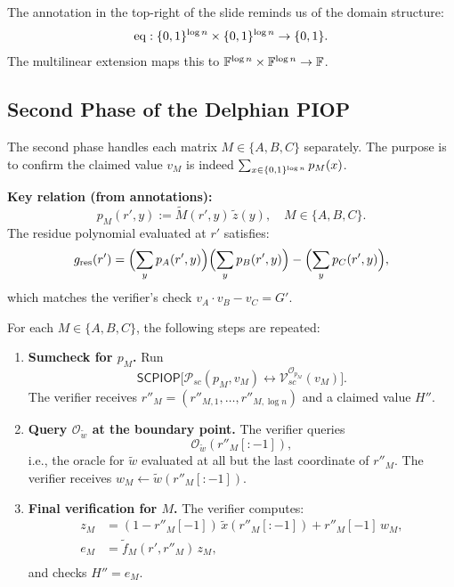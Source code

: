 \documentclass[11pt]{article}
\newcommand{\tildew}{\tilde{w}}
\newcommand{\tildez}{\tilde{z}}
\newcommand{\tildex}{\tilde{x}}
\newcommand{\tildeM}{\widetilde{M}}
\begin{document}
\begin{remark}
  The annotation in the top-right of the slide reminds us of the domain structure:
  \[
    \mathrm{eq} : \{0,1\}^{\log n} \times \{0,1\}^{\log n} \to \{0,1\}.
  \]
  The multilinear extension maps this to $\mathbb{F}^{\log n} \times \mathbb{F}^{\log n} \to \mathbb{F}$.
\end{remark}

\subsection{Second Phase of the Delphian PIOP}

The second phase handles each matrix $M \in \{A, B, C\}$ separately.  The purpose is to
confirm the claimed value $v_M$ is indeed $\sum_{x \in \{0,1\}^{\log n}} p_M(x)$.

\medskip
\noindent\textbf{Key relation (from annotations):}
\[
  p_M(r', y) := \tildeM(r', y)\,\tildez(y), \quad M \in \{A, B, C\}.
\]
The residue polynomial evaluated at $r'$ satisfies:
\[
  g_{\mathrm{res}}(r')
  = \Bigl(\sum_y p_A(r',y)\Bigr)\Bigl(\sum_y p_B(r',y)\Bigr)
    - \Bigl(\sum_y p_C(r',y)\Bigr),
\]
which matches the verifier's check $v_A \cdot v_B - v_C = G'$.

\bigskip
\noindent For each $M \in \{A, B, C\}$, the following steps are repeated:

\begin{enumerate}
  \item \textbf{Sumcheck for $p_M$.}  Run
    \[
      \mathsf{SCPIOP}\bigl[\mathcal{P}_{sc}(p_M, v_M)
      \leftrightarrow \mathcal{V}_{sc}^{\mathcal{O}_{p_M}}(v_M)\bigr].
    \]
    The verifier receives
    $r''_M = (r''_{M,1}, \ldots, r''_{M,\log n})$ and a claimed value $H''$.

  \item \textbf{Query $\mathcal{O}_{\tildew}$ at the boundary point.}  The verifier queries
    \[
      \mathcal{O}_{\tildew}(r''_M[:-1]),
    \]
    i.e., the oracle for $\tildew$ evaluated at all but the last coordinate of $r''_M$.
    The verifier receives $w_M \leftarrow \tildew(r''_M[:-1])$.

  \item \textbf{Final verification for $M$.}  The verifier computes:
    \begin{align*}
      z_M   &= (1 - r''_M[-1])\,\tildex(r''_M[:-1]) + r''_M[-1]\, w_M, \\
      e_M   &= \tilde{f}_M(r', r''_M)\, z_M, \\
    \end{align*}
    and checks $H'' = e_M$.
\end{enumerate}
\end{document}
